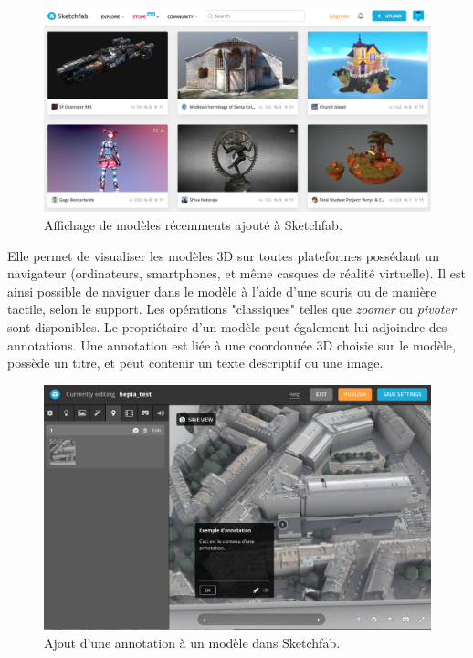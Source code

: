 \begin{figure}
    \centering
    \includegraphics[width=\linewidth]{Figures/sketchfab-overview.png}
    \caption{Affichage de modèles récemments ajouté à Sketchfab.}
    \label{fig:sketchfab-overview}
\end{figure}

Elle permet de visualiser les modèles 3D sur toutes plateformes possédant un navigateur (ordinateurs, smartphones, et même casques de réalité virtuelle).
Il est ainsi possible de naviguer dans le modèle à l'aide d'une souris ou de manière tactile, selon le support. Les opérations "classiques" telles que \textit{zoomer} ou \textit{pivoter} sont disponibles.
Le propriétaire d'un modèle peut également lui adjoindre des annotations. Une annotation est liée à une coordonnée 3D choisie sur le modèle, possède un titre, et peut contenir un texte descriptif ou une image.

\begin{figure}[ht]
    \centering
    \includegraphics[width=\linewidth]{Figures/sketchfab-annotation-example.png}
    \caption{Ajout d'une annotation à un modèle dans Sketchfab.}
    \label{fig:sketchfab-annotation-example}
\end{figure}

